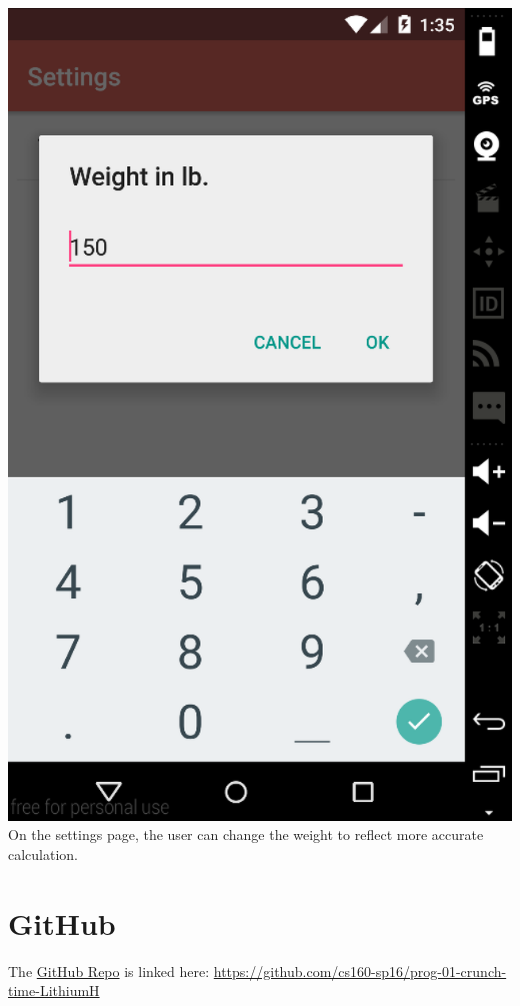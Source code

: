 \documentclass[11pt]{article}
\begin{document}
\includegraphics[scale=0.3]{shot5.png}\\
On the settings page, the user can change the weight to reflect more accurate calculation.\\

\section{GitHub}
The \href{https://github.com/cs160-sp16/prog-01-crunch-time-LithiumH}{GitHub Repo} is linked
here: \url{https://github.com/cs160-sp16/prog-01-crunch-time-LithiumH}
\end{document}
